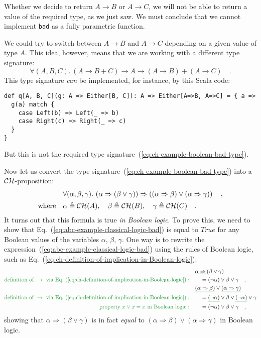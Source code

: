 Whether we decide to return $A\rightarrow B$ or $A\rightarrow C$,
we will not be able to return a value of the required type, as we
just saw. We must conclude that we cannot implement \lstinline!bad!
as a fully parametric function.

We could try to switch between $A\rightarrow B$ and $A\rightarrow C$
depending on a given value of type $A$. This idea, however, means
that we are working with a different type signature: 
\[
\forall(A,B,C).\,\left(A\rightarrow B+C\right)\rightarrow A\rightarrow\left(A\rightarrow B\right)+\left(A\rightarrow C\right)\quad.
\]
This type signature \emph{can} be implemented, for instance, by this
Scala code:
\begin{lstlisting}
def q[A, B, C](g: A => Either[B, C]): A => Either[A=>B, A=>C] = { a =>
  g(a) match {
    case Left(b) => Left(_ => b)
    case Right(c) => Right(_ => c)
  }
}
\end{lstlisting}
But this is not the required type signature~(\ref{eq:ch-example-boolean-bad-type}).

Now let us convert the type signature~(\ref{eq:ch-example-boolean-bad-type})
into a ${\cal CH}$-proposition:
\begin{align}
 & \forall(\alpha,\beta,\gamma).\,\left(\alpha\Rightarrow\left(\beta\vee\gamma\right)\right)\Rightarrow\left(\left(\alpha\Rightarrow\beta\right)\vee\left(\alpha\Rightarrow\gamma\right)\right)\quad,\label{eq:abc-example-classical-logic-bad}\\
\text{where}\quad & \alpha\triangleq{\cal CH}(A),\quad\beta\triangleq{\cal CH}(B),\quad\gamma\triangleq{\cal CH}(C)\quad.\nonumber 
\end{align}
It turns out that this formula is true \emph{in Boolean logic}. To
prove this, we need to show that Eq.~(\ref{eq:abc-example-classical-logic-bad})
is equal to $True$ for any Boolean values of the variables $\alpha$,
$\beta$, $\gamma$. One way is to rewrite the expression~(\ref{eq:abc-example-classical-logic-bad})
using the rules of Boolean logic, such as Eq.~(\ref{eq:ch-definition-of-implication-in-Boolean-logic}):
\begin{align*}
 & \gunderline{\alpha\Rightarrow}\left(\beta\vee\gamma\right)\\
{\color{greenunder}\text{definition of }\rightarrow\text{ via Eq.~(\ref{eq:ch-definition-of-implication-in-Boolean-logic})}:}\quad & \quad=(\neg\alpha)\vee\beta\vee\gamma\quad,\\
 & \gunderline{\left(\alpha\Rightarrow\beta\right)}\vee\gunderline{\left(\alpha\Rightarrow\gamma\right)}\\
{\color{greenunder}\text{definition of }\rightarrow\text{ via Eq.~(\ref{eq:ch-definition-of-implication-in-Boolean-logic})}:}\quad & \quad=\gunderline{(\neg\alpha)}\vee\beta\vee\gunderline{(\neg\alpha)}\vee\gamma\\
{\color{greenunder}\text{property }x\vee x=x\text{ in Boolean logic}:}\quad & \quad=(\neg\alpha)\vee\beta\vee\gamma\quad,
\end{align*}
showing that $\alpha\Rightarrow(\beta\vee\gamma)$ is in fact \emph{equal}
to $\left(\alpha\Rightarrow\beta\right)\vee\left(\alpha\Rightarrow\gamma\right)$
in Boolean logic.

